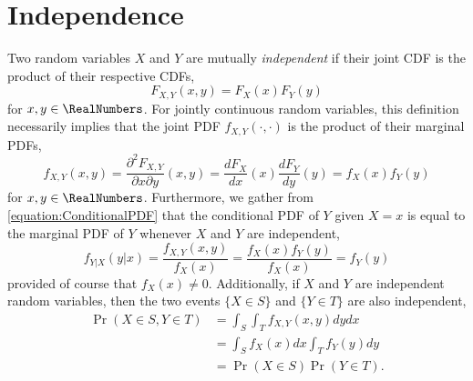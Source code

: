 \section{Independence}

Two random variables $X$ and $Y$ are mutually \emph{independent} if their joint CDF is the product of their respective CDFs, 
\begin{equation*}
F_{X,Y} (x,y) = F_X (x) F_Y(y)
\end{equation*}
for $x, y \in \RealNumbers$.
For jointly continuous random variables, this definition necessarily implies that the joint PDF $f_{X,Y}(\cdot, \cdot)$ is the product of their marginal PDFs,
\begin{equation*}
f_{X,Y} (x,y) = \frac{\partial^2 F_{X,Y}}{\partial x \partial y} (x, y)
= \frac{d F_X}{dx} (x) \frac{d F_Y}{dy} (y)
= f_X (x) f_Y (y)
\end{equation*}
for $x, y \in \RealNumbers$.
Furthermore, we gather from \eqref{equation:ConditionalPDF} that the conditional PDF of $Y$ given $X=x$ is equal to the marginal PDF of $Y$ whenever $X$ and $Y$ are independent,
\begin{equation*}
f_{Y|X} (y|x) = \frac{f_{X,Y} (x, y)}{f_X(x)}
= \frac{f_X (x) f_Y (y)}{f_X(x)} = f_Y (y)
\end{equation*}
provided of course that $f_X(x) \neq 0$.
Additionally, if $X$ and $Y$ are independent random variables, then the two events $\{ X \in S \}$ and $\{ Y \in T \}$ are also independent,
\begin{equation*}
\begin{split}
\Pr (X \in S, Y \in T) &= \int_S \int_T f_{X,Y} (x,y) dy dx \\
&= \int_S f_X (x) dx \int_T f_Y (y) dy \\
&= \Pr (X \in S) \Pr (Y \in T).
\end{split}
\end{equation*}

